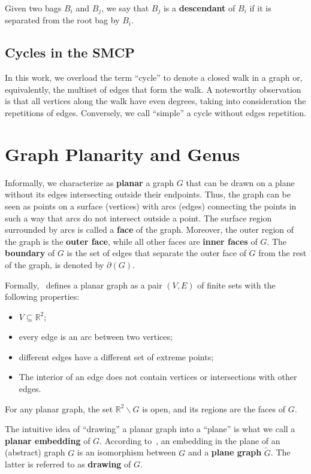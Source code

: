 Given two bags \(B_i\) and \(B_j\), we say that \(B_j\) is a \textbf{descendant} of \(B_i\) if it is separated from the root bag by \(B_i\).

\subsection{Cycles in the SMCP}

In this work, we overload the term ``cycle'' to denote a closed walk in a graph or, equivalently, the multiset of edges that form the walk. A noteworthy observation is that all vertices along the walk have even degrees, taking into consideration the repetitions of edges. Conversely, we call ``simple'' a cycle without edges repetition.

\section{Graph Planarity and Genus}

Informally, we characterize as \textbf{planar} a graph \(G\) that can be drawn on a plane without its edges intersecting outside their endpoints. Thus, the graph can be seen as points on a surface (vertices) with arcs (edges) connecting the points in such a way that arcs do not intersect outside a point. The surface region surrounded by arcs is called a \textbf{face} of the graph. Moreover, the outer region of the graph is the \textbf{outer face}, while all other faces are \textbf{inner faces} of \(G\). The \textbf{boundary} of \(G\) is the set of edges that separate the outer face of \(G\) from the rest of the graph, is denoted by \(\partial(G)\).

Formally,~\cite{Diestel} defines a planar graph as a pair \((V, E)\) of finite sets with the following properties:

\begin{itemize}
    \item \(V \subseteq \mathbb{R}^2\);
    \item every edge is an arc between two vertices;
    \item different edges have a different set of extreme points;
    \item The interior of an edge does not contain vertices or intersections with other edges.
\end{itemize}

For any planar graph, the set \(\mathbb{R}^2 \backslash G\) is open, and its regions are the faces of \(G\).

The intuitive idea of ``drawing'' a planar graph into a ``plane'' is what we call a \textbf{planar embedding} of \(G\). According to~\cite{Diestel}, an embedding in the plane of an (abstract) graph \(G\) is an isomorphism between \(G\) and a \textbf{plane graph} \(\tilde{G}\). The latter is referred to as \textbf{drawing} of \(G\).

